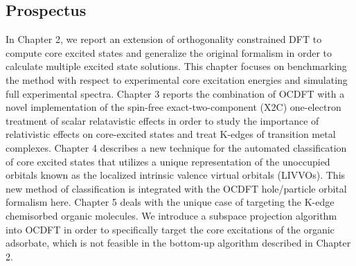\documentclass[final]{emory}
\begin{document}
\subsection{Prospectus}
In Chapter 2, we report an extension of orthogonality constrained DFT to compute core excited states and generalize the original formalism in order to calculate multiple excited state solutions. This chapter focuses on benchmarking the method with respect to experimental core excitation energies and simulating full experimental spectra. Chapter 3 reports the combination of OCDFT with a novel implementation of the spin-free exact-two-component (X2C) one-electron treatment of scalar relatavistic effects in order to study the importance of relativistic effects on core-excited states and treat K-edges of transition metal complexes. Chapter 4 describes a new technique for the automated classification of core excited states that utilizes a unique representation of the unoccupied orbitals known as the localized intrinsic valence virtual orbitals (LIVVOs). This new method of classification is integrated with the OCDFT hole/particle orbital formalism here. Chapter 5 deals with the unique case of targeting the K-edge chemisorbed organic molecules. We introduce a subspace projection algorithm into OCDFT in order to specifically target the core excitations of the organic adsorbate, which is not feasible in the bottom-up algorithm described in Chapter 2.


\end{document}
